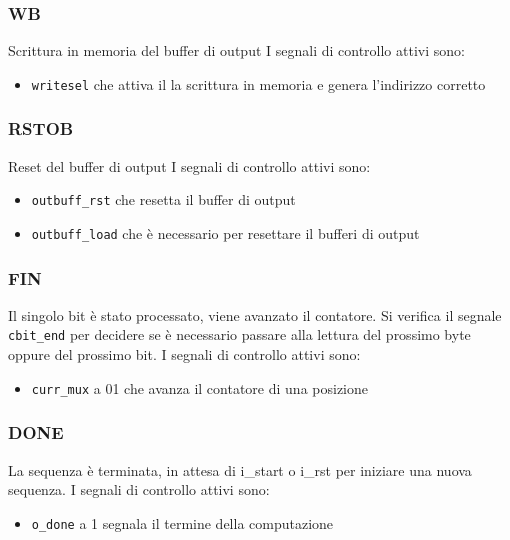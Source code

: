 \documentclass[12pt, a4paper]{article}
\begin{document}
\subsubsection{WB}
Scrittura in memoria del buffer di output
I segnali di controllo attivi sono:
\begin{itemize}
    \item \texttt{writesel} che attiva il la scrittura in memoria e genera l'indirizzo corretto
\end{itemize}

\subsubsection{RSTOB}
Reset del buffer di output
I segnali di controllo attivi sono:
\begin{itemize}
    \item \texttt{outbuff\_rst} che resetta il buffer di output
    \item \texttt{outbuff\_load} che è necessario per resettare il bufferi di output
\end{itemize}

\subsubsection{FIN}
Il singolo bit è stato processato, viene avanzato il contatore.
Si verifica il segnale \texttt{cbit\_end} per decidere se è necessario passare alla lettura del
prossimo byte oppure del prossimo bit.
I segnali di controllo attivi sono:
\begin{itemize}
    \item \texttt{curr\_mux} a 01 che avanza il contatore di una posizione
\end{itemize}

\subsubsection{DONE}
La sequenza è terminata, in attesa di i\_start o i\_rst per iniziare una nuova sequenza.
I segnali di controllo attivi sono:
\begin{itemize}
    \item \texttt{o\_done} a 1 segnala il termine della computazione
\end{itemize}
\end{document}
